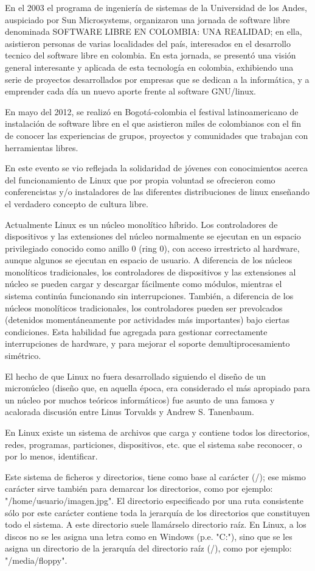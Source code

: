 En el 2003 el programa de ingeniería de sistemas de la
Universidad de los Andes, auspiciado por Sun Microsystems,
organizaron una jornada de software libre denominada
SOFTWARE LIBRE EN COLOMBIA: UNA REALIDAD; en ella,
asistieron personas de varias localidades del país, interesados
en el desarrollo tecnico del software libre en colombia. En esta
jornada, se presentó una visión general interesante y aplicada
de esta tecnología en colombia, exhibiendo una serie de
proyectos desarrollados por empresas que se dedican a la
informática, y a emprender cada día un nuevo aporte frente al
software GNU/linux.

En mayo del 2012, se realizó en Bogotá-colombia el festival
latinoamericano de instalación de software libre en el que
asistieron miles de colombianos con el fin de conocer las
experiencias de grupos, proyectos y comunidades que trabajan
con herramientas libres.

En este evento se vio reflejada la solidaridad de jóvenes con
conocimientos acerca del funcionamiento de Linux que por
propia voluntad se ofrecieron como conferencistas y/o
instaladores de las diferentes distribuciones de linux enseñando
el verdadero concepto de cultura libre.

Actualmente Linux es un núcleo monolítico híbrido. Los
controladores de dispositivos y las extensiones del núcleo
normalmente se ejecutan en un espacio privilegiado conocido
como anillo 0 (ring 0), con acceso irrestricto al hardware,
aunque algunos se ejecutan en espacio de usuario. A diferencia
de los núcleos monolíticos tradicionales, los controladores de
dispositivos y las extensiones al núcleo se pueden cargar y
descargar fácilmente como módulos, mientras el sistema
continúa funcionando sin interrupciones. También, a diferencia
de los núcleos monolíticos tradicionales, los controladores
pueden ser prevolcados (detenidos momentáneamente por
actividades más importantes) bajo ciertas condiciones. Esta
habilidad fue agregada para gestionar correctamente
interrupciones de hardware, y para mejorar el soporte
demultiprocesamiento simétrico.

El hecho de que Linux no fuera desarrollado siguiendo el diseño
de un micronúcleo (diseño que, en aquella época, era
considerado el más apropiado para un núcleo por muchos
teóricos informáticos) fue asunto de una famosa y acalorada
discusión entre Linus Torvalds y Andrew S. Tanenbaum.

En Linux existe un sistema de archivos que carga y contiene
todos los directorios, redes, programas, particiones, dispositivos,
etc. que el sistema sabe reconocer, o por lo menos, identificar.

Este sistema de ficheros y directorios, tiene como base al
carácter (/); ese mismo carácter sirve también para demarcar los
directorios, como por ejemplo: "/home/usuario/imagen.jpg". El
directorio especificado por una ruta consistente sólo por este
carácter contiene toda la jerarquía de los directorios que
constituyen todo el sistema. A este directorio suele llamárselo
directorio raíz. En Linux, a los discos no se les asigna una letra
como en Windows (p.e. "C:"), sino que se les asigna un directorio
de la jerarquía del directorio raíz (/), como por ejemplo:
"/media/floppy".
 



